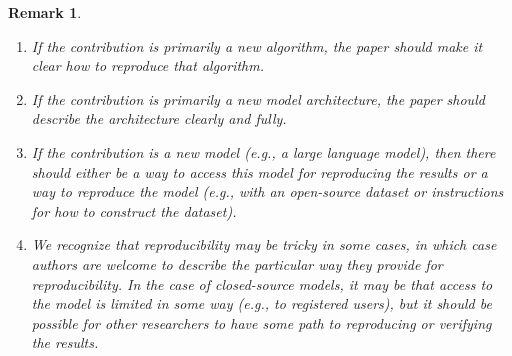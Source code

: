 \documentclass{article}
\newtheorem{remark}{Remark}
\begin{document}
\begin{remark}
\begin{enumerate}
\begin{itemize}
        \begin{enumerate}
            \item If the contribution is primarily a new algorithm, the paper should make it clear how to reproduce that algorithm.
            \item If the contribution is primarily a new model architecture, the paper should describe the architecture clearly and fully.
            \item If the contribution is a new model (e.g., a large language model), then there should either be a way to access this model for reproducing the results or a way to reproduce the model (e.g., with an open-source dataset or instructions for how to construct the dataset).
            \item We recognize that reproducibility may be tricky in some cases, in which case authors are welcome to describe the particular way they provide for reproducibility. In the case of closed-source models, it may be that access to the model is limited in some way (e.g., to registered users), but it should be possible for other researchers to have some path to reproducing or verifying the results.
        \end{enumerate}
    \end{itemize}



\end{enumerate}
\end{remark}
\end{document}

